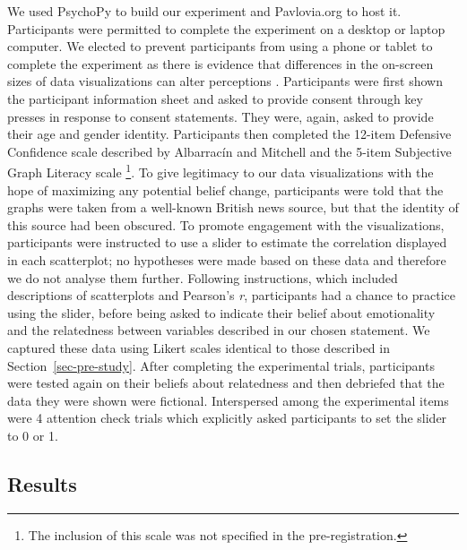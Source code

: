 \documentclass[manuscript,screen,review,anonymous]{acmart}
\begin{document}
We used PsychoPy \citep{pierce_2019} to build our experiment and
Pavlovia.org to host it. Participants were permitted to complete the
experiment on a desktop or laptop computer. We elected to prevent
participants from using a phone or tablet to complete the experiment as
there is evidence that differences in the on-screen sizes of data
visualizations can alter perceptions \citep{cleveland_1982}.
Participants were first shown the participant information sheet and
asked to provide consent through key presses in response to consent
statements. They were, again, asked to provide their age and gender
identity. Participants then completed the 12-item Defensive Confidence
scale described by Albarracín and Mitchell \citep{albarracin_2004} and
the 5-item Subjective Graph Literacy scale \citep{garcia_2016}
\footnote{The inclusion of this scale was not specified in the
  pre-registration.}. To give legitimacy to our data visualizations with
the hope of maximizing any potential belief change, participants were
told that the graphs were taken from a well-known British news source,
but that the identity of this source had been obscured. To promote
engagement with the visualizations, participants were instructed to use
a slider to estimate the correlation displayed in each scatterplot; no
hypotheses were made based on these data and therefore we do not analyse
them further. Following instructions, which included descriptions of
scatterplots and Pearson's \emph{r}, participants had a chance to
practice using the slider, before being asked to indicate their belief
about emotionality and the relatedness between variables described in
our chosen statement. We captured these data using Likert scales
identical to those described in Section~\ref{sec-pre-study}. After
completing the experimental trials, participants were tested again on
their beliefs about relatedness and then debriefed that the data they
were shown were fictional. Interspersed among the experimental items
were 4 attention check trials which explicitly asked participants to set
the slider to 0 or 1.

\subsection{Results}\label{sec-results-main}
\end{document}
